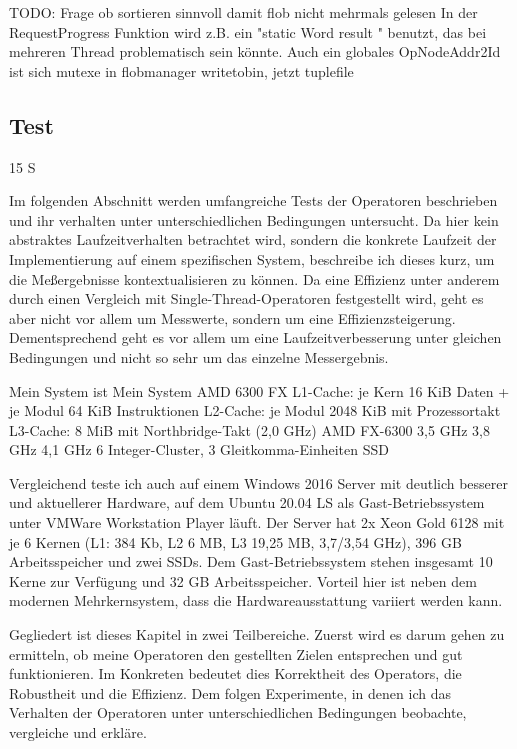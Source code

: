 \documentclass[a4paper,12pt,twoside]{article}
\begin{document}
TODO: Frage ob sortieren sinnvoll damit flob nicht mehrmals gelesen
In der RequestProgress Funktion wird z.B. ein "static Word result " benutzt, das bei mehreren Thread problematisch sein könnte. 
Auch ein globales OpNodeAddr2Id ist sich
mutexe in flobmanager
writetobin, jetzt tuplefile

\subsection{Test} 15 S

Im folgenden Abschnitt werden umfangreiche Tests der Operatoren beschrieben und ihr verhalten unter unterschiedlichen Bedingungen untersucht. Da hier kein abstraktes Laufzeitverhalten betrachtet wird, sondern die konkrete Laufzeit der Implementierung auf einem spezifischen System, beschreibe ich dieses kurz, um die Meßergebnisse kontextualisieren zu können. Da eine Effizienz unter anderem durch einen Vergleich mit Single-Thread-Operatoren festgestellt wird, geht es aber nicht vor allem um Messwerte, sondern um eine Effizienzsteigerung. Dementsprechend geht es vor allem um eine Laufzeitverbesserung unter gleichen Bedingungen und nicht so sehr um das einzelne Messergebnis.

Mein System ist 
Mein System AMD 6300 FX
L1-Cache: je Kern 16 KiB Daten + je Modul 64 KiB Instruktionen
L2-Cache: je Modul 2048 KiB mit Prozessortakt
L3-Cache: 8 MiB mit Northbridge-Takt (2,0 GHz)
AMD FX-6300 	3,5 GHz 	3,8 GHz 	4,1 GHz
6 Integer-Cluster, 3 Gleitkomma-Einheiten
SSD 

Vergleichend teste ich auch auf einem Windows 2016 Server mit deutlich besserer und aktuellerer Hardware, auf dem Ubuntu 20.04 LS als Gast-Betriebssystem unter VMWare Workstation Player läuft. Der Server hat 2x Xeon Gold 6128 mit je 6 Kernen (L1: 384 Kb, L2 6 MB, L3 19,25 MB, 3,7/3,54 GHz), 396 GB Arbeitsspeicher und zwei SSDs. Dem Gast-Betriebssystem stehen insgesamt 10 Kerne zur Verfügung und 32 GB Arbeitsspeicher. Vorteil hier ist neben dem modernen Mehrkernsystem, dass die Hardwareausstattung variiert werden kann.  

Gegliedert ist dieses Kapitel in zwei Teilbereiche. Zuerst wird es darum gehen zu ermitteln, ob meine Operatoren den gestellten Zielen entsprechen und gut funktionieren. Im Konkreten bedeutet dies Korrektheit des Operators, die Robustheit und die Effizienz. Dem folgen Experimente, in denen ich das Verhalten der Operatoren unter unterschiedlichen Bedingungen beobachte, vergleiche und erkläre. 
\end{document}

